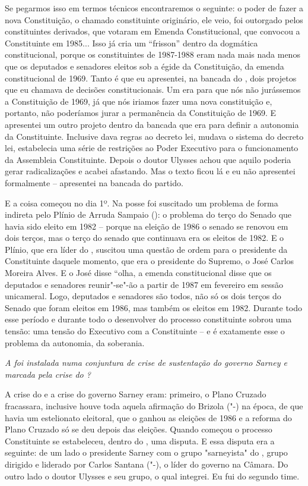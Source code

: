 Se pegarmos isso em termos técnicos encontraremos o seguinte: o poder de
fazer a nova Constituição, o chamado constituinte originário, ele veio,
foi outorgado pelos constituintes derivados, que votaram em Emenda
Constitucional, que convocou a Constituinte em 1985... Isso já cria um
``frisson'' dentro da dogmática constitucional, porque os constituintes
de 1987-1988 eram nada mais nada menos que os deputados e senadores
eleitos sob a égide da Constituição, da emenda constitucional de 1969.
Tanto é que eu apresentei, na bancada do , dois projetos que eu
chamava de decisões constitucionais. Um era para que nós não jurássemos
a Constituição de 1969, já que nós iriamos fazer uma nova constituição
e, portanto, não poderíamos jurar a permanência da Constituição de 1969.
E apresentei um outro projeto dentro da bancada que era para definir a
autonomia da Constituinte. Inclusive dava regras ao decreto lei, mudava
o sistema do decreto lei, estabelecia uma série de restrições ao Poder
Executivo para o funcionamento da Assembleia Constituinte. Depois o
doutor Ulysses achou que aquilo poderia gerar radicalizações e acabei
afastando. Mas o texto ficou lá e eu não apresentei formalmente --
apresentei na bancada do partido.

E a coisa começou no dia 1º. Na posse foi suscitado um problema de forma
indireta pelo Plínio de Arruda Sampaio (): o problema do terço do
Senado que havia sido eleito em 1982 -- porque na eleição de 1986 o
senado se renovou em dois terços, mas o terço do senado que continuava
era os eleitos de 1982. E o Plínio, que era líder do , suscitou uma
questão de ordem para o presidente da Constituinte daquele momento, que
era o presidente do Supremo, o José Carlos Moreira Alves. E o José disse
``olha, a emenda constitucional disse que os deputados e senadores
reunir"-se"-ão a partir de 1987 em fevereiro em sessão unicameral. Logo,
deputados e senadores são todos, não só os dois terços do Senado que
foram eleitos em 1986, mas também os eleitos em 1982. Durante todo esse
período e durante todo o desenvolver do processo constituinte sobrou uma
tensão: uma tensão do Executivo com a Constituinte -- e é exatamente
esse o problema da autonomia, da soberania.

\emph{A  foi instalada numa conjuntura de crise de sustentação do
governo Sarney e marcada pela crise do ?}

A crise do  e a crise do governo Sarney eram:
primeiro, o Plano Cruzado fracassara, inclusive houve toda aquela
afirmação do Brizola ("-) na época, de que havia um estelionato
eleitoral, que o  ganhou as eleições de 1986 e a reforma do Plano
Cruzado só se deu depois das eleições. Quando começou o processo
Constituinte se estabeleceu, dentro do , uma disputa. E essa disputa
era a seguinte: de um lado o presidente Sarney com o grupo "sarneyista"
do , grupo dirigido e liderado por Carlos Santana ("-), o líder
do governo na Câmara. Do outro lado o doutor Ulysses e seu grupo, o qual
integrei. Eu fui do segundo time.

